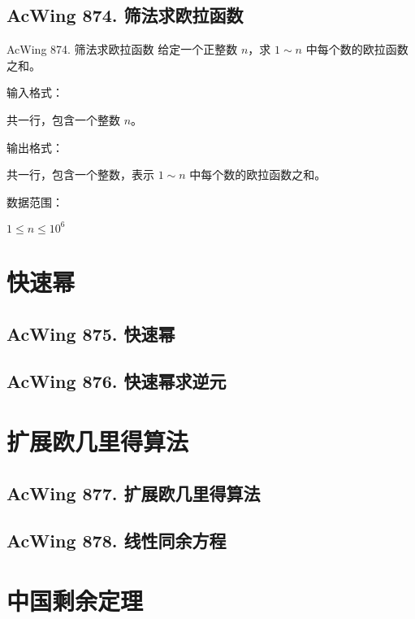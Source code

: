 \subsection{AcWing 874. 筛法求欧拉函数}
\begin{titledbox}{AcWing 874. 筛法求欧拉函数}
    给定一个正整数 $n$，求 $1 \sim n$ 中每个数的欧拉函数之和。

    输入格式：

    共一行，包含一个整数 $n$。

    输出格式：

    共一行，包含一个整数，表示 $1 \sim n$ 中每个数的欧拉函数之和。

    数据范围：

    $1 \le n \le 10^6$

    \begin{inputblock}
    \end{inputblock}
    \begin{outputblock}
    \end{outputblock}
\end{titledbox}


\section{快速幂}

\subsection{AcWing 875. 快速幂}

\subsection{AcWing 876. 快速幂求逆元}


\section{扩展欧几里得算法}

\subsection{AcWing 877. 扩展欧几里得算法}

\subsection{AcWing 878. 线性同余方程}


\section{中国剩余定理}


